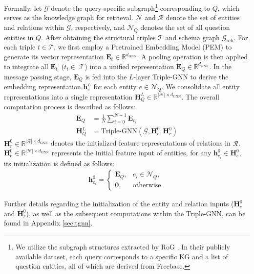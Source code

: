 \documentclass[11pt]{article}
\begin{document}
Formally, let \( \mathcal{G} \) denote the query-specific subgraph\footnote{We utilize the subgraph structures extracted by RoG \cite{luo2024reasoning}. In their publicly available dataset, each query corresponds to a specific KG and a list of question entities, all of which are derived from Freebase.} corresponding to $Q$, which serves as the knowledge graph for retrieval. $ \mathcal{N} $ and $ \mathcal{R} $ denote the set of entities and relations within \( \mathcal{G} \), respectively, and  \(\mathcal{N}_Q\) denotes the set of all question entities in $Q$. After obtaining the structural triples \(\mathcal{T}\) and schema graph $\mathcal{G}_\text{sch}$. For each triple \(t \in \mathcal{T}\), we first employ a Pretrained Embedding Model (PEM) to generate its vector representation $\mathbf{E}_{t} \in \mathbb{R}^{d_\text{GNN}}$. A pooling operation is then applied to integrate all $\mathbf{E}_{t_i}$ ($t_i \in$ \( \mathcal{T} \)) into a unified representation $\mathbf{E}_Q \in \mathbb{R}^{d_\text{GNN}}$. In the message passing stage, $\mathbf{E}_Q$ is fed into the $L$-layer Triple-GNN to derive the embedding representation $\mathbf{h}^L_e$ for each entity $e \in \mathcal{N}_Q$. We consolidate all entity representations into a single representation $\mathbf{H}^L_Q \in \mathbb{R}^{|\mathcal{N}|\times d_\text{GNN}}$. The overall computation process is described as follows:
\begin{align}
\mathbf{E}_Q & = \frac{1}{N}\sum_{i=0}^{N-1} \mathbf{E}_{t_i} \\
\mathbf{H}^L_Q &=  \text{Triple-GNN}(\mathcal{G}, \mathbf{H}_e^0, \mathbf{H}_r^0)
\end{align}
$\mathbf{H}_r^0 \in \mathbb{R}^{|\mathcal{R}|\times d_\text{GNN}}$ denotes the initialized feature representations of relations in $\mathcal{R}$. $\mathbf{H}^0_e \in \mathbb{R}^{|\mathcal{N}|\times d_\text{GNN}}$ represents the initial feature input of entities, for any $\mathbf{h}_{e_i}^0 \in \mathbf{H}_e^0$, its initialization is defined as follows:
\begin{align}
\mathbf{h}_{e_i}^0 = \begin{cases} 
\mathbf{E}_Q, & e_i \in \mathcal{N}_Q, \\
\mathbf{0}, & \text{otherwise}.
\end{cases}
\end{align}

Further details regarding the initialization of the entity and relation inputs ($\mathbf{H}_e^0$ and $\mathbf{H}_r^0$), as well as the subsequent computations within the Triple-GNN, can be found in Appendix \ref{sec:tgnn}. 
\end{document}
